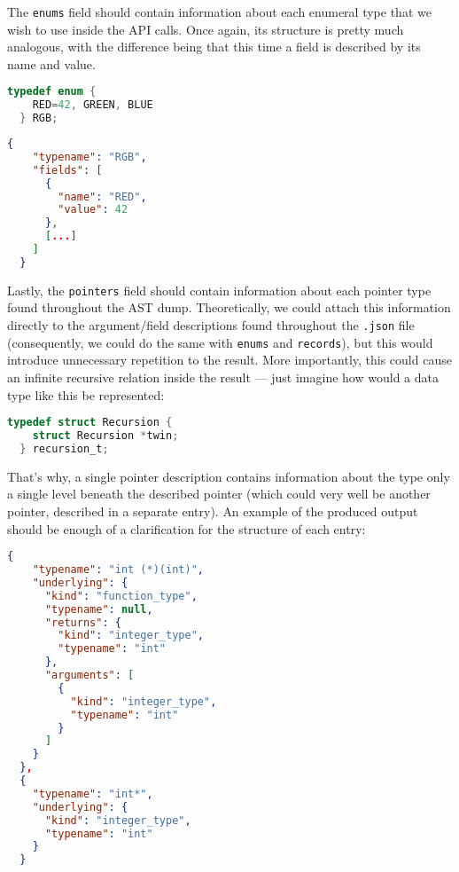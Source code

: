 \documentclass[polish, english]{iithesis}
\begin{document}
The \texttt{enums} field should contain information about each enumeral type that we wish to use inside the API calls.
Once again, its structure is pretty much analogous, with the difference being that this time a field is described by its name and value.
\begin{lstlisting}[language=c, caption=Example \texttt{enum} declaration]
  typedef enum {
    RED=42, GREEN, BLUE
  } RGB;
\end{lstlisting}
\begin{lstlisting}[language=json, caption=Fragment of the corresponding \texttt{enum} description in the resulting \texttt{.json}]
  {
    "typename": "RGB",
    "fields": [
      {
        "name": "RED",
        "value": 42
      }, 
      [...]
    ]
  }
\end{lstlisting} 

Lastly, the \texttt{pointers} field should contain information about each pointer type found throughout the AST dump.
Theoretically, we could attach this information directly to the argument/field descriptions found throughout the \texttt{.json} file (consequently, we could do the same with \texttt{enums} and \texttt{records}), but this would introduce unnecessary repetition to the result.
More importantly, this could cause an infinite recursive relation inside the result --- just imagine how would a data type like this be represented:
\begin{lstlisting}[language=c, caption=\texttt{recursion\_t} data type causing problems for the parser]
  typedef struct Recursion {
    struct Recursion *twin;
  } recursion_t;
\end{lstlisting}
That's why, a single pointer description contains information about the type only a single level beneath the described pointer (which could very well be another pointer, described in a separate entry).
An example of the produced output should be enough of a clarification for the structure of each entry:
\begin{lstlisting}[language=json, caption=Several example entries inside the \texttt{pointers} array]
  {
    "typename": "int (*)(int)",
    "underlying": {
      "kind": "function_type",
      "typename": null,
      "returns": {
        "kind": "integer_type",
        "typename": "int"
      },
      "arguments": [
        {
          "kind": "integer_type",
          "typename": "int"
        }
      ]
    }
  },
  {
    "typename": "int*",
    "underlying": {
      "kind": "integer_type",
      "typename": "int"
    }
  }
\end{lstlisting}
\end{document}
